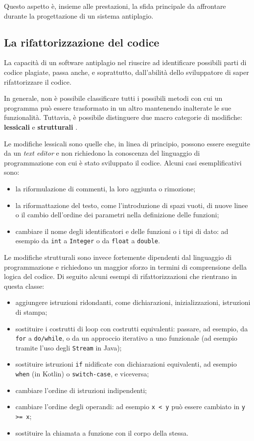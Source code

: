 Questo aspetto è, insieme alle prestazioni, la sfida principale da affrontare durante la progettazione di un sistema antiplagio.

\subsection{La rifattorizzazione del codice}
La capacità di un software antiplagio nel riuscire ad identificare possibili parti di codice plagiate, passa anche, e soprattutto, dall'abilità dello sviluppatore di saper rifattorizzare il codice.

In generale, non è possibile classificare tutti i possibili metodi con cui un programma può essere trasformato in un altro mantenendo inalterate le sue funzionalità.
%
Tuttavia, è possibile distinguere due macro categorie di modifiche: \textbf{lessicali} e \textbf{strutturali} \cite{joy-99}.

Le modifiche lessicali sono quelle che, in linea di principio, possono essere eseguite da un \textit{text editor} e non richiedono la conoscenza del linguaggio di programmazione con cui è stato sviluppato il codice. 
%
Alcuni casi esemplificativi sono:
\begin{itemize}
    \item la riformulazione di commenti, la loro aggiunta o rimozione;
    \item la riformattazione del testo, come l'introduzione di spazi vuoti, di nuove linee o il cambio dell'ordine dei parametri nella definizione delle funzioni;
    \item cambiare il nome degli identificatori e delle funzioni o i tipi di dato: ad esempio da \texttt{int} a \texttt{Integer} o da \texttt{float} a \texttt{double}.
\end{itemize}

Le modifiche strutturali sono invece fortemente dipendenti dal linguaggio di programmazione e richiedono un maggior sforzo in termini di comprensione della logica del codice.
%
Di seguito alcuni esempi di rifattorizzazioni che rientrano in questa classe:
\begin{itemize}
    \item aggiungere istruzioni ridondanti, come dichiarazioni, inizializzazioni, istruzioni di stampa;
    \item sostituire i costrutti di loop con costrutti equivalenti: passare, ad esempio, da \texttt{for} a \texttt{do/while}, o da un approccio iterativo a uno funzionale (ad esempio tramite l'uso degli \texttt{Stream} in Java);
    \item sostituire istruzioni \texttt{if} nidificate con dichiarazioni equivalenti, ad esempio \texttt{when} (in Kotlin) o \texttt{switch-case}, e viceversa;
    \item cambiare l'ordine di istruzioni indipendenti;
    \item cambiare l'ordine degli operandi: ad esempio \texttt{x < y} può essere cambiato in \texttt{y >= x};
    \item sostituire la chiamata a funzione con il corpo della stessa.
\end{itemize}


